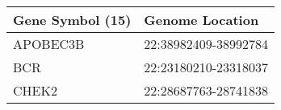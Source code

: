\begin{tabular}{ll}
\toprule
Gene Symbol (15) &      Genome Location \\
\midrule
        APOBEC3B & 22:38982409-38992784 \\
             BCR & 22:23180210-23318037 \\
           CHEK2 & 22:28687763-28741838 \\
\bottomrule
\end{tabular}
